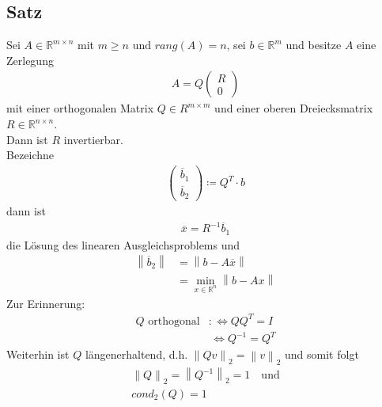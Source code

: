 \documentclass[ngerman,fontsize=11pt, paper=a4, parskip=half, titlepage=true, toc=bib]{scrbook}
\newcommand{\R}{\mathds{R}}
\newcommand{\Ren}{\mathds{R}^{n}}
\newcommand{\nn}[1]{\left\| #1 \right\|}
\begin{document}
  
  \subsection{Satz}
  Sei $A\in \R^{m\times n} $ mit $m\geq n$ und $rang(A) = n$,
  sei $b\in\R^m$ und besitze $A$ eine Zerlegung
  \begin{gather*}
    A= Q\begin{pmatrix}R\\0\end{pmatrix}
  \end{gather*}
  mit einer orthogonalen Matrix $Q\in R^{m\times m}$ und 
  einer oberen Dreiecksmatrix $R\in \R^{n\times n}$. \\
  Dann ist $R$ invertierbar. \\
  Bezeichne 
  \begin{gather}
    \begin{pmatrix} \overline{b}_1 \\ \overline{b}_2\end{pmatrix}
    \coloneqq Q^T\cdot b
    \label{IV.3.9}
  \end{gather}
  dann ist
  \begin{gather}
    \overline{x} = R^{-1} \overline{b}_1 
    \label{IV.3.10}
  \end{gather}
  die Lösung des linearen Ausgleichsproblems und
  \begin{align*}
    \nn{\overline{b}_2} &= \nn{b-A\overline{x}} \\
                        & = \min_{x\in \Ren }\nn{b-Ax}
  \end{align*}
  Zur Erinnerung:
  \begin{align*}
    Q \text{ orthogonal} &:\Leftrightarrow QQ^T = I \\
                         &\, \Leftrightarrow Q^{-1} = Q^T
  \end{align*}
  Weiterhin ist $Q$ längenerhaltend, d.h. $\nn{Qv}_2 = \nn{v}_2$ 
  und somit folgt
  \begin{gather}
    \nonumber
    \nn{Q}_2 = \nn{Q^{-1}}_2 = 1 \quad \text{und} \\
    cond_2(Q) = 1
    \label{IV.3.11}
  \end{gather}
  
\end{document}

